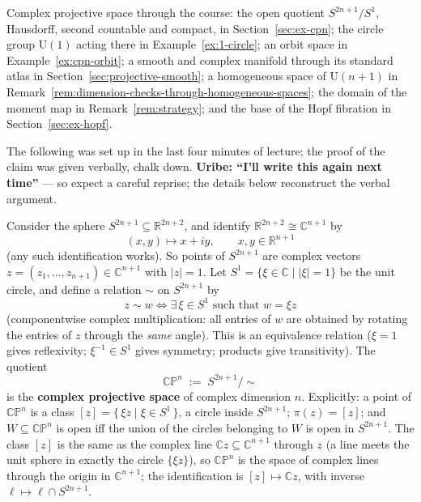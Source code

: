 \documentclass[11pt]{report}
\makeatletter
\newcounter{defcounter}[section]
\newcommand{\deflabel}[1]{\edef\@currentlabel{\arabic{section}.\arabic{defcounter}}\label{#1}}
\newcommand{\Ugp}{\mathrm{U}}
\newcommand{\leeref}[1]{\par\smallskip{\raggedleft\footnotesize\textsc{Lee}:\ #1\par}}
\makeatother
\begin{document}
Complex projective space through the course: the open quotient $S^{2n+1}/S^1$, Hausdorff, second countable and compact, in Section~\ref{sec:ex-cpn}; the circle group $\Ugp(1)$ acting there in Example~\ref{ex:1-circle}; an orbit space in Example~\ref{ex:cpn-orbit}; a smooth and complex manifold through its standard atlas in Section~\ref{sec:projective-smooth}; a homogeneous space of $\Ugp(n+1)$ in Remark~\ref{rem:dimension-checks-through-homogeneous-spaces}; the domain of the moment map in Remark~\ref{rem:strategy}; and the base of the Hopf fibration in Section~\ref{sec:ex-hopf}.

\label{sub:cpn}
The following was set up in the last four minutes of lecture; the proof of the claim was given verbally, chalk down. \textbf{Uribe: ``I'll write this again next time''} --- so expect a careful reprise; the details below reconstruct the verbal argument.

\begin{defbox}\deflabel{def:cpn}
Consider the sphere $S^{2n+1} \subseteq \mathbb{R}^{2n+2}$, and identify $\mathbb{R}^{2n+2} \cong \mathbb{C}^{n+1}$ by
\[
(x, y) \longmapsto x + iy, \qquad x, y \in \mathbb{R}^{n+1}
\]
(any such identification works). So points of $S^{2n+1}$ are complex vectors $z = (z_1, \dots, z_{n+1}) \in \mathbb{C}^{n+1}$ with $|z| = 1$. Let $S^1 = \{\xi \in \mathbb{C} \mid |\xi| = 1\}$ be the unit circle, and define a relation $\sim$ on $S^{2n+1}$ by
\[
z \sim w \iff \exists\, \xi \in S^1 \text{ such that } w = \xi z
\]
(componentwise complex multiplication: all entries of $w$ are obtained by rotating the entries of $z$ through the \emph{same} angle). This is an equivalence relation ($\xi = 1$ gives reflexivity; $\xi^{-1} \in S^1$ gives symmetry; products give transitivity). The quotient
\[
\mathbb{CP}^n \;:=\; S^{2n+1}/{\sim}
\]
is the \textbf{complex projective space} of complex dimension $n$. Explicitly: a point of $\mathbb{CP}^n$ is a class $[z] = \{\, \xi z \mid \xi \in S^1 \,\}$, a circle inside $S^{2n+1}$; $\pi(z) = [z]$; and $W \subseteq \mathbb{CP}^n$ is open iff the union of the circles belonging to $W$ is open in $S^{2n+1}$. The class $[z]$ is the same as the complex line $\mathbb{C} z \subseteq \mathbb{C}^{n+1}$ through $z$ (a line meets the unit sphere in exactly the circle $\{\xi z\}$), so $\mathbb{CP}^n$ is the space of complex lines through the origin in $\mathbb{C}^{n+1}$; the identification is $[z] \mapsto \mathbb{C} z$, with inverse $\ell \mapsto \ell \cap S^{2n+1}$.
\leeref{Problem 1-9}
\end{defbox}
\end{document}
